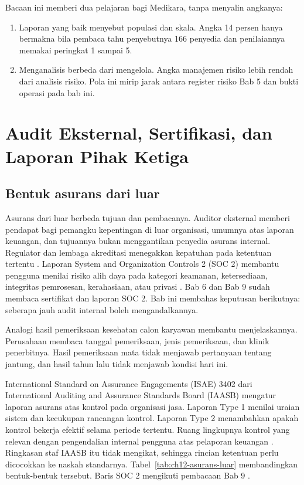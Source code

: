 Bacaan ini memberi dua pelajaran bagi Medikara, tanpa menyalin angkanya:
\begin{enumerate}
  \item Laporan yang baik menyebut populasi dan skala. Angka 14 persen hanya bermakna bila pembaca
  tahu penyebutnya 166 penyedia dan penilaiannya memakai peringkat 1 sampai 5.
  \item Menganalisis berbeda dari mengelola. Angka manajemen risiko lebih rendah dari analisis
  risiko. Pola ini mirip jarak antara register risiko Bab 5 dan bukti operasi pada bab ini.
\end{enumerate}

\section{Audit Eksternal, Sertifikasi, dan Laporan Pihak Ketiga}

\subsection*{Bentuk asurans dari luar}

Asurans dari luar berbeda tujuan dan pembacanya. Auditor eksternal memberi pendapat bagi pemangku
kepentingan di luar organisasi, umumnya atas laporan keuangan, dan tujuannya bukan menggantikan
penyedia asurans internal. Regulator dan lembaga akreditasi menegakkan kepatuhan pada ketentuan
tertentu \cite{iia-tlm2026}. Laporan System and Organization Controls 2 (SOC 2) membantu pengguna
menilai risiko alih daya pada kategori keamanan, ketersediaan, integritas pemrosesan, kerahasiaan,
atau privasi \cite{c09-aicpa-soc}. Bab 6 dan Bab 9 sudah membaca sertifikat dan laporan SOC 2. Bab
ini membahas keputusan berikutnya: seberapa jauh audit internal boleh mengandalkannya.

Analogi hasil pemeriksaan kesehatan calon karyawan membantu menjelaskannya. Perusahaan membaca
tanggal pemeriksaan, jenis pemeriksaan, dan klinik penerbitnya. Hasil pemeriksaan mata tidak
menjawab pertanyaan tentang jantung, dan hasil tahun lalu tidak menjawab kondisi hari ini.

International Standard on Assurance Engagements (ISAE) 3402 dari International Auditing and
Assurance Standards Board (IAASB) mengatur laporan asurans atas kontrol pada organisasi jasa.
Laporan Type 1 menilai uraian sistem dan kecukupan rancangan kontrol. Laporan Type 2 menambahkan
apakah kontrol bekerja efektif selama periode tertentu. Ruang lingkupnya kontrol yang relevan dengan
pengendalian internal pengguna atas pelaporan keuangan \cite{c12-isae3402}. Ringkasan staf IAASB itu
tidak mengikat, sehingga rincian ketentuan perlu dicocokkan ke naskah standarnya.
Tabel~\ref{tab:ch12-asurans-luar} membandingkan bentuk-bentuk tersebut. Baris SOC 2 mengikuti
pembacaan Bab 9 \cite{c09-deloitte-soc}.


